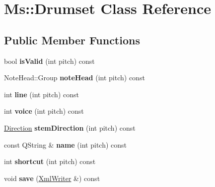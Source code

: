 \hypertarget{class_ms_1_1_drumset}{}\section{Ms\+:\+:Drumset Class Reference}
\label{class_ms_1_1_drumset}
\subsection*{Public Member Functions}
\begin{DoxyCompactItemize}
\item 
\mbox{\label{class_ms_1_1_drumset_a0c116c7a1faa14e7d3f5b583561f5245}} 
bool {\bfseries is\+Valid} (int pitch) const
\item 
\mbox{\label{class_ms_1_1_drumset_a57e943db32934a5f5b85f56d6cc5dc47}} 
Note\+Head\+::\+Group {\bfseries note\+Head} (int pitch) const
\item 
\mbox{\label{class_ms_1_1_drumset_a19e7739fa57e35a79928fa58766d9c5a}} 
int {\bfseries line} (int pitch) const
\item 
\mbox{\label{class_ms_1_1_drumset_a86efad5c5a2ed1b101524bed56206348}} 
int {\bfseries voice} (int pitch) const
\item 
\mbox{\label{class_ms_1_1_drumset_aba68558b6c961c97ae76fa3e05598c2b}} 
\hyperlink{class_ms_1_1_direction}{Direction} {\bfseries stem\+Direction} (int pitch) const
\item 
\mbox{\label{class_ms_1_1_drumset_a9ed7969405d138e3c73e900e625d6616}} 
const Q\+String \& {\bfseries name} (int pitch) const
\item 
\mbox{\label{class_ms_1_1_drumset_ad6a3f431032f633c89f985a6fe4b2f9e}} 
int {\bfseries shortcut} (int pitch) const
\item 
\mbox{\label{class_ms_1_1_drumset_a7c2612db79f51125ec40b8aad3615fa6}} 
void {\bfseries save} (\hyperlink{class_ms_1_1_xml_writer}{Xml\+Writer} \&) const
\item 
\mbox{\label{class_ms_1_1_drumset_a316ec25b9cc704812e31c3b57e3645bf}} 

\end{DoxyCompactItemize}
